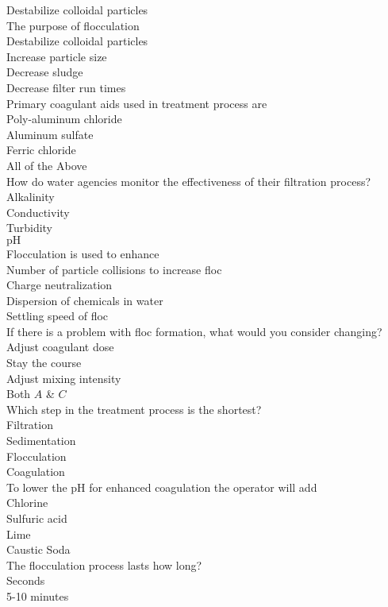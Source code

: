 Destabilize colloidal particles\\
 The purpose of flocculation\\
Destabilize colloidal particles\\
Increase particle size\\
Decrease sludge\\
Decrease filter run times\\
 Primary coagulant aids used in treatment process are\\
Poly-aluminum chloride\\
Aluminum sulfate\\
Ferric chloride\\
All of the Above\\
 How do water agencies monitor the effectiveness of their filtration process?\\
Alkalinity\\
Conductivity\\
Turbidity\\
$\mathrm{pH}$\\
Flocculation is used to enhance\\
Number of particle collisions to increase floc\\
Charge neutralization\\
Dispersion of chemicals in water\\
Settling speed of floc\\
 If there is a problem with floc formation, what would you consider changing?\\
Adjust coagulant dose\\
Stay the course\\
Adjust mixing intensity\\
Both $A$ \& $C$\\
 Which step in the treatment process is the shortest?\\
Filtration\\
Sedimentation\\
Flocculation\\
Coagulation\\
 To lower the $\mathrm{pH}$ for enhanced coagulation the operator will add\\
Chlorine\\
Sulfuric acid\\
Lime\\
Caustic Soda\\
 The flocculation process lasts how long?\\
Seconds\\
5-10 minutes\\
